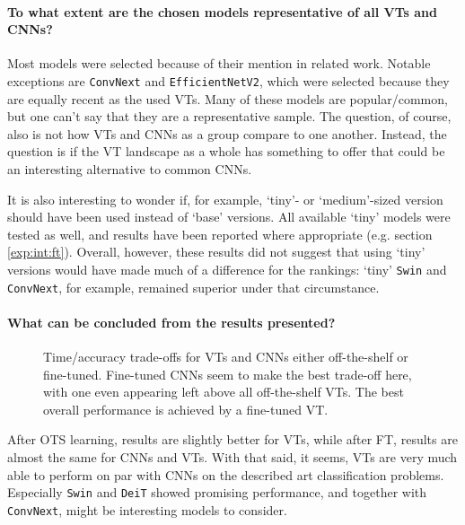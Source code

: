 
\paragraph{To what extent are the chosen models representative of all VTs and CNNs?}
Most models were selected because of their mention in related work. Notable exceptions are \texttt{ConvNext} and \texttt{EfficientNetV2}, which were selected because they are equally recent as the used VTs. Many of these models are popular/common, but one can't say that they are a representative sample. The question, of course, also is not how VTs and CNNs as a group compare to one another. Instead, the question is if the VT landscape as a whole has something to offer that could be an interesting alternative to common CNNs.

It is also interesting to wonder if, for example, `tiny'- or `medium'-sized version should have been used instead of `base' versions. All available `tiny' models were tested as well, and results have been reported where appropriate (e.g. section \ref{exp:int:ft}). Overall, however, these results did not suggest that using `tiny' versions would have made much of a difference for the rankings: `tiny' \texttt{Swin} and \texttt{ConvNext}, for example, remained superior under that circumstance.

\paragraph{What can be concluded from the results presented?}

\begin{figure}[tbh]
    \centering
    \def\svgwidth{7.7cm}
    
    \caption{Time/accuracy trade-offs for VTs and CNNs either off-the-shelf or fine-tuned. Fine-tuned CNNs seem to make the best trade-off here, with one even appearing left above all off-the-shelf VTs. The best overall performance is achieved by a fine-tuned VT.}
    \label{results:img:ots_vs_ft_type}
\end{figure}

After OTS learning, results are slightly better for VTs, while after FT, results are almost the same for CNNs and VTs. With that said, it seems, VTs are very much able to perform on par with CNNs on the described art classification problems. Especially \texttt{Swin} and \texttt{DeiT} showed promising performance, and together with \texttt{ConvNext}, might be interesting models to consider.

